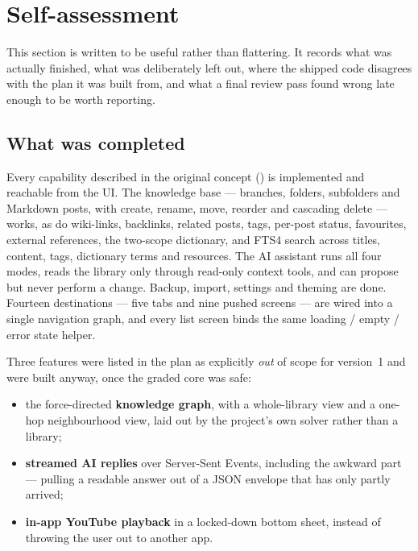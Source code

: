 \section{Self-assessment}
\label{sec:self}

This section is written to be useful rather than flattering. It records what was actually finished,
what was deliberately left out, where the shipped code disagrees with the plan it was built from, and
what a final review pass found wrong late enough to be worth reporting.

\subsection{What was completed}

Every capability described in the original concept () is implemented and reachable
from the UI. The knowledge base --- branches, folders, subfolders and Markdown posts, with create,
rename, move, reorder and cascading delete --- works, as do wiki-links, backlinks, related posts,
tags, per-post status, favourites, external references, the two-scope dictionary, and FTS4 search
across titles, content, tags, dictionary terms and resources. The AI assistant runs all four modes,
reads the library only through read-only context tools, and can propose but never perform a change.
Backup, import, settings and theming are done. Fourteen destinations --- five tabs and nine pushed
screens --- are wired into a single navigation graph, and every list screen binds the same loading /
empty / error state helper.

Three features were listed in the plan as explicitly \emph{out} of scope for version~1 and were built
anyway, once the graded core was safe:

\begin{itemize}
  \item the force-directed \textbf{knowledge graph}, with a whole-library view and a one-hop
        neighbourhood view, laid out by the project's own solver rather than a library;
  \item \textbf{streamed AI replies} over Server-Sent Events, including the awkward part --- pulling a
        readable answer out of a JSON envelope that has only partly arrived;
  \item \textbf{in-app YouTube playback} in a locked-down bottom sheet, instead of throwing the user
        out to another app.
\end{itemize}

